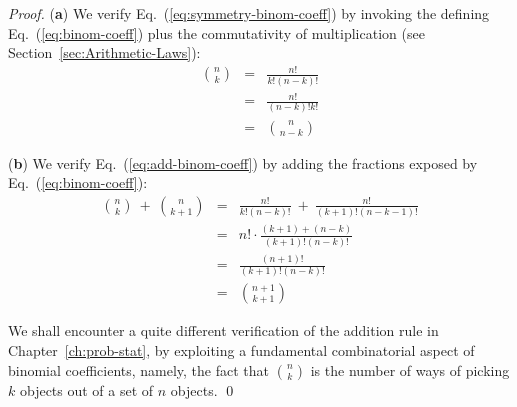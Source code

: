 \begin{proof}
({\bf a})
We verify Eq.~(\ref{eq:symmetry-binom-coeff}) by invoking the defining Eq.~(\ref{eq:binom-coeff}) plus the commutativity of multiplication (see Section~\ref{sec:Arithmetic-Laws}):
\begin{eqnarray*}
{n \choose k} & = & \frac{n!}{k!(n-k)!} \\
              & = & \frac{n!}{(n-k)!k!} \\
              & = & {n \choose {n-k}}
\end{eqnarray*}

\noindent ({\bf b})
We verify Eq.~(\ref{eq:add-binom-coeff}) by adding the fractions exposed by Eq.~(\ref{eq:binom-coeff}):
\begin{eqnarray*}
{n \choose k} \ + \ {n \choose {k+1}}
  & = &
\frac{n!}{k!(n-k)!} \ + \ \frac{n!}{(k+1)!(n-k-1)!} \\
  & = &
n! \cdot \frac{(k+1) + (n-k)} {(k+1)!(n-k)!} \\
  & = & 
\frac{(n+1)!}{(k+1)!(n-k)!} \\
  & = &
{{n+1} \choose {k+1}}
\end{eqnarray*}

\medskip

We shall encounter a quite different verification of the addition rule in Chapter~\ref{ch:prob-stat}, by exploiting a fundamental combinatorial aspect of binomial coefficients, namely, the fact that $\displaystyle {n \choose k}$ is the number of ways of picking $k$ objects out of a set of $n$ objects.  \qed
\end{proof}

\bigskip

